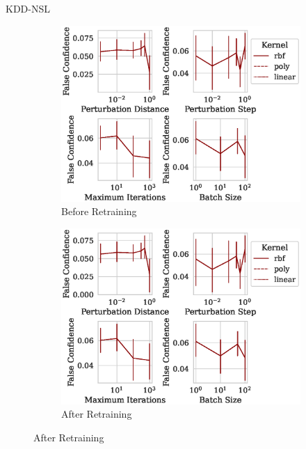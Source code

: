 \documentclass{beamer}
\begin{document}
\begin{frame}{KDD-NSL}
\begin{figure}
\begin{subfigure}{0.4\textwidth}
         \centering
         \includegraphics[width=\textwidth]{./kdd-nsl/confidence_vs_attack_parameters.eps}
         \caption{Before Retraining}
     \end{subfigure}
     \hfill
     \begin{subfigure}{0.4\textwidth}
         \centering
         \includegraphics[width=\textwidth]{./kdd-nsl/retrain_confidence_vs_attack_parameters.eps}
         \caption{After Retraining}
     \end{subfigure}
     
     \label{fig:kdd-nsl}
\end{figure}
\end{frame}
\end{document}
